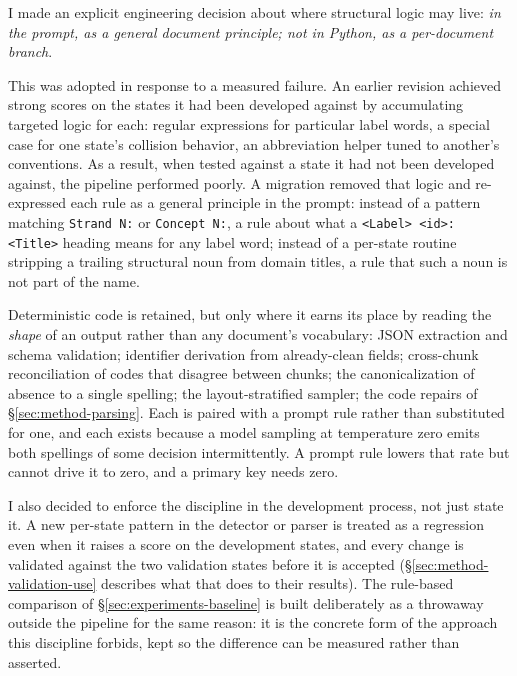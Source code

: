 I made an explicit engineering decision about where structural logic may
live: \emph{in the prompt, as a general document principle; not in Python, as
a per-document branch}.

This was adopted in response to a measured failure. An earlier revision achieved
strong scores on the states it had been developed against by accumulating
targeted logic for each: regular expressions for particular label words, a
special case for one state's collision behavior, an abbreviation helper tuned to
another's conventions. As a result, when tested against a state it had not been developed against, the pipeline performed poorly. A
migration removed that logic and re-expressed each rule as a general principle in
the prompt: instead of a pattern matching \texttt{Strand N:} or
\texttt{Concept N:}, a rule about what a \texttt{<Label> <id>: <Title>} heading
means for any label word; instead of a per-state routine stripping a trailing
structural noun from domain titles, a rule that such a noun is not part of the
name.

Deterministic code is retained, but only where it earns its place by reading the
\emph{shape} of an output rather than any document's vocabulary: JSON extraction
and schema validation; identifier derivation from already-clean fields;
cross-chunk reconciliation of codes that disagree between chunks; the
canonicalization of absence to a single spelling; the layout-stratified sampler;
the code repairs of \S\ref{sec:method-parsing}. Each is paired with a prompt rule
rather than substituted for one, and each exists because a model sampling at
temperature zero emits both spellings of some decision intermittently. A
prompt rule lowers that rate but cannot drive it to zero, and a primary key needs
zero.

I also decided to enforce the discipline in the development process, not just
state it. A new per-state pattern in the detector or parser is treated as a
regression even when it raises a score on the development states, and every
change is validated against the two validation states before it is accepted
(\S\ref{sec:method-validation-use} describes what that does to their results). The rule-based comparison of \S\ref{sec:experiments-baseline} is
built deliberately as a throwaway outside the pipeline for the same reason: it is
the concrete form of the approach this discipline forbids, kept so the difference
can be measured rather than asserted.

